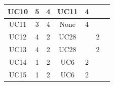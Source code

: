\documentclass[12pt]{article}
\begin{document}
\begin{longtable}{|c|ccc|l|l|l|}
		UC10                 & \multicolumn{1}{c|}{5}               & \multicolumn{1}{c|}{4}                                                                         & UC11               & \multicolumn{1}{c|}{4}                                                                     &                                                                                               &                                                                                            \\ \hline
		UC11                 & \multicolumn{1}{c|}{3}               & \multicolumn{1}{c|}{4}                                                                         & None               & \multicolumn{1}{c|}{4}                                                                     &                                                                                               &                                                                                            \\ \hline
		UC12                 & \multicolumn{1}{c|}{4}               & \multicolumn{1}{c|}{2}                                                                         & UC28               &                                                                                            & \multicolumn{1}{c|}{2}                                                                        &                                                                                            \\ \hline
		UC13                 & \multicolumn{1}{c|}{4}               & \multicolumn{1}{c|}{2}                                                                         & UC28               &                                                                                            & \multicolumn{1}{c|}{2}                                                                        &                                                                                            \\ \hline
		UC14                 & \multicolumn{1}{c|}{1}               & \multicolumn{1}{c|}{2}                                                                         & UC6                & \multicolumn{1}{c|}{2}                                                                     &                                                                                               &                                                                                            \\ \hline
		UC15                 & \multicolumn{1}{c|}{1}               & \multicolumn{1}{c|}{2}                                                                         & UC6                & \multicolumn{1}{c|}{2}                                                                     &                                                                                               &                                                                                            \\ \hline

\end{longtable}
\end{document}
